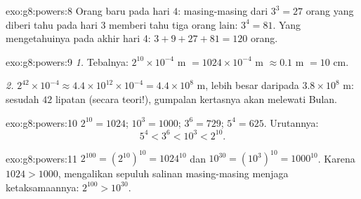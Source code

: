 \begin{solution}{exo:g8:powers:8}
Orang baru pada hari $4$: masing-masing dari $3^3 = 27$ orang yang
diberi tahu pada hari 3 memberi tahu tiga orang lain: $3^4 = 81$. Yang
mengetahuinya pada akhir hari 4: $3 + 9 + 27 + 81 = 120$ orang.
\end{solution}

\begin{solution}{exo:g8:powers:9}
\emph{1.} Tebalnya: $2^{10} \times 10^{-4}$ m
$= 1024 \times 10^{-4}$ m $\approx 0.1$ m $= 10$ cm.

\emph{2.} $2^{42} \times 10^{-4} \approx 4.4 \times 10^{12} \times
10^{-4} = 4.4 \times 10^8$ m, lebih besar daripada
$3.8 \times 10^8$ m: sesudah $42$ lipatan (secara teori!), gumpalan
kertasnya akan melewati Bulan.
\end{solution}

\begin{solution}{exo:g8:powers:10}
$2^{10} = 1024$; $10^3 = 1000$; $3^6 = 729$; $5^4 = 625$. Urutannya:
\[
5^4 < 3^6 < 10^3 < 2^{10} .
\]
\end{solution}

\begin{solution}{exo:g8:powers:11}
$2^{100} = \left(2^{10}\right)^{10} = 1024^{10}$ dan
$10^{30} = \left(10^3\right)^{10} = 1000^{10}$. Karena $1024 > 1000$,
mengalikan sepuluh salinan masing-masing menjaga ketaksamaannya:
$2^{100} > 10^{30}$.
\end{solution}


